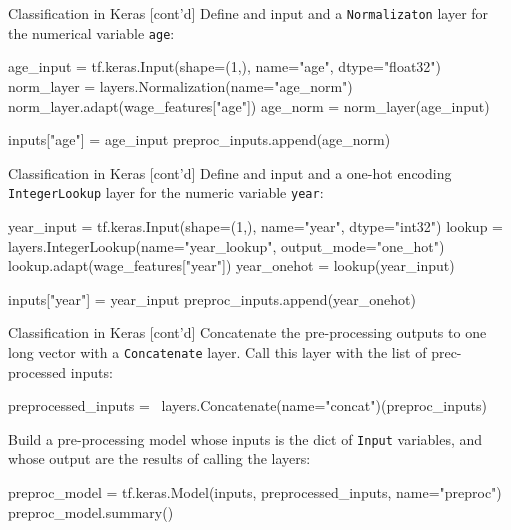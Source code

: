 \documentclass[ignorenonframetext,xcolor=x11names]{beamer}
\begin{document}
\begin{frame}[label=withcode,fragile]{Classification in Keras \small [cont'd]}
Define and input and a \texttt{Normalizaton} layer for the numerical variable \texttt{age}:
\begin{pythoncode}
age_input = tf.keras.Input(shape=(1,), 
                           name="age", 
                           dtype="float32")
norm_layer = layers.Normalization(name="age_norm")
norm_layer.adapt(wage_features["age"])
age_norm = norm_layer(age_input)

inputs["age"] = age_input
preproc_inputs.append(age_norm)
\end{pythoncode}
\end{frame}

\begin{frame}[label=withcode,fragile]{Classification in Keras \small [cont'd]}
Define and input and a one-hot encoding \texttt{IntegerLookup} layer for the numeric variable \texttt{year}:
\begin{pythoncode}
year_input = tf.keras.Input(shape=(1,), 
                           name="year", 
                           dtype="int32")
lookup = layers.IntegerLookup(name="year_lookup",
                              output_mode="one_hot")
lookup.adapt(wage_features["year"])
year_onehot = lookup(year_input)

inputs["year"] = year_input
preproc_inputs.append(year_onehot)
\end{pythoncode}
\end{frame}

\begin{frame}[label=withcode,fragile]{Classification in Keras \small [cont'd]}
Concatenate the pre-processing outputs to one long vector with a \texttt{Concatenate} layer. Call this layer with the list of prec-processed inputs:
\begin{pythoncode}
preprocessed_inputs = \
    layers.Concatenate(name="concat")(preproc_inputs)
\end{pythoncode}
Build a pre-processing model whose inputs is the dict of \texttt{Input} variables, and whose output are the results of calling the layers:
\begin{pythoncode}
preproc_model = tf.keras.Model(inputs, 
                               preprocessed_inputs,
                               name="preproc")
preproc_model.summary()
\end{pythoncode}
\end{frame}
\end{document}
